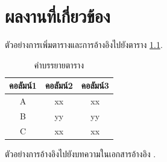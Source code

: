 \chapter{ผลงานที่เกี่ยวข้อง}
\label{Ch:RelatedWork}

ตัวอย่างการเพิ่มตารางและการอ้างอิงไปยังตาราง \ref{table:example_table}.

\begin{table}[h]
\centering
\begin{tabular}{|c|c|c|}
\hline
คอลัมน์1 & คอลัมน์2 & คอลัมน์3 \\ 
\hline
A & xx & xx \\ 
\hline
B & yy & yy \\ 
\hline
C & xx & xx  \\ 
\hline
\end{tabular}
\captionsetup{justification=centering, name=ตาราง}
\caption{คำบรรยายตาราง}
\label{table:example_table}
\end{table}

ตัวอย่างการอ้างอิงไปยังบทความในเอกสารอ้างอิง \cite{parker2020}. 